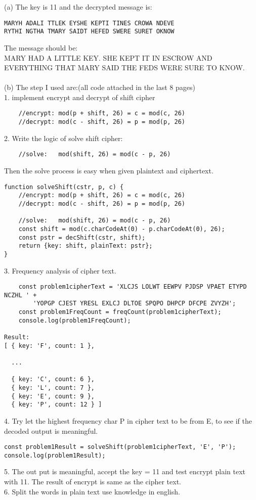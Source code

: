 \documentclass[paper=a4, fontsize=11pt]{scrartcl} %
\numberwithin{equation}{section} %
\numberwithin{figure}{section} %
\begin{document}
(a) The key is 11 and the decrypted message is: \\
\begin{lstlisting}
MARYH ADALI TTLEK EYSHE KEPTI TINES CROWA NDEVE
RYTHI NGTHA TMARY SAIDT HEFED SWERE SURET OKNOW
\end{lstlisting}
The message should be:\\
MARY HAD A LITTLE KEY. SHE KEPT IT IN ESCROW AND EVERYTHING THAT MARY SAID THE FEDS WERE SURE TO KNOW.\\
\\
(b) The step I used are:(all code attached in the last 8 pages)\\
1. implement encrypt and decrypt of shift cipher\\
\begin{lstlisting}
    //encrypt: mod(p + shift, 26) = c = mod(c, 26)
    //decrypt: mod(c - shift, 26) = p = mod(p, 26)
\end{lstlisting}
2. Write the logic of solve shift cipher:\\
\begin{lstlisting}
    //solve:   mod(shift, 26) = mod(c - p, 26)
\end{lstlisting}
Then the solve process is easy when given plaintext and ciphertext.\\
\begin{lstlisting}
function solveShift(cstr, p, c) {
    //encrypt: mod(p + shift, 26) = c = mod(c, 26)
    //decrypt: mod(c - shift, 26) = p = mod(p, 26)
    
    //solve:   mod(shift, 26) = mod(c - p, 26)
    const shift = mod(c.charCodeAt(0) - p.charCodeAt(0), 26);
    const pstr = decShift(cstr, shift);
    return {key: shift, plainText: pstr};
}
\end{lstlisting}

3. Frequency analysis of cipher text.\\
\begin{lstlisting}
    const problem1cipherText = 'XLCJS LOLWT EEWPV PJDSP VPAET ETYPD NCZHL ' +
        'YOPGP CJEST YRESL EXLCJ DLTOE SPQPO DHPCP DFCPE ZVYZH';
    const problem1FreqCount = freqCount(problem1cipherText);
    console.log(problem1FreqCount);

Result:     
[ { key: 'F', count: 1 },

  ...

  { key: 'C', count: 6 },
  { key: 'L', count: 7 },
  { key: 'E', count: 9 },
  { key: 'P', count: 12 } ]
\end{lstlisting}
4. Try let the highest frequency char P in cipher text to be from E, to see if the decoded output is meaningful.\\
\begin{lstlisting}
const problem1Result = solveShift(problem1cipherText, 'E', 'P');
console.log(problem1Result);
\end{lstlisting}
5. The out put is meaningful, accept the key = 11 and test encrypt plain text with 11. The result of encrypt is same as the cipher text.\\
6. Split the words in plain text use knowledge in english.\\
\end{document}
